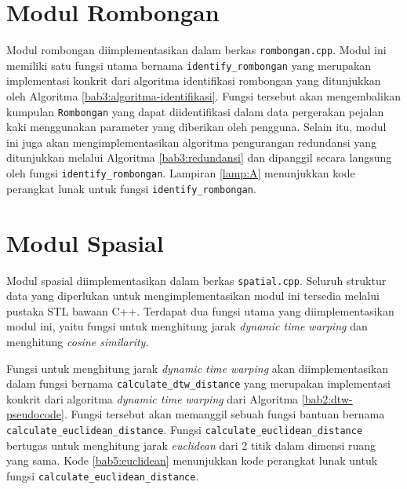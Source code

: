 \section{Modul Rombongan}
\label{sec:impl-rombongan}

Modul rombongan diimplementasikan dalam berkas \texttt{rombongan.cpp}. Modul ini memiliki satu fungsi utama bernama \texttt{identify\_rombongan} yang merupakan implementasi konkrit dari algoritma identifikasi rombongan yang ditunjukkan oleh Algoritma \ref{bab3:algoritma-identifikasi}. Fungsi tersebut akan mengembalikan kumpulan \texttt{Rombongan} yang dapat diidentifikasi dalam data pergerakan pejalan kaki menggunakan parameter yang diberikan oleh pengguna. Selain itu, modul ini juga akan mengimplementasikan algoritma pengurangan redundansi yang ditunjukkan melalui Algoritma \ref{bab3:redundansi} dan dipanggil secara langsung oleh fungsi \texttt{identify\_rombongan}. Lampiran \ref{lamp:A} menunjukkan kode perangkat lunak untuk fungsi \texttt{identify\_rombongan}.

\section{Modul Spasial}

Modul spasial diimplementasikan dalam berkas \texttt{spatial.cpp}. Seluruh struktur data yang diperlukan untuk mengimplementasikan modul ini tersedia melalui pustaka STL bawaan C++. Terdapat dua fungsi utama yang diimplementasikan modul ini, yaitu fungsi untuk menghitung jarak \textit{dynamic time warping} dan menghitung \textit{cosine similarity}.

Fungsi untuk menghitung jarak \textit{dynamic time warping} akan diimplementasikan dalam fungsi bernama \texttt{calculate\_dtw\_distance} yang merupakan implementasi konkrit dari algoritma \textit{dynamic time warping} dari Algoritma \ref{bab2:dtw-pseudocode}. Fungsi tersebut akan memanggil sebuah fungsi bantuan bernama \texttt{calculate\_euclidean\_distance}. Fungsi \texttt{calculate\_euclidean\_distance} bertugas untuk menghitung jarak \textit{euclidean} dari 2 titik dalam dimensi ruang yang sama. Kode \ref{bab5:euclidean} menunjukkan kode perangkat lunak untuk fungsi \texttt{calculate\_euclidean\_distance}.

